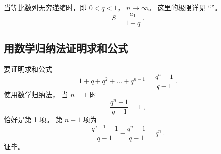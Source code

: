当等比数列无穷递缩时，即 $0<q<1$， $n\rightarrow \infty$。 这里的极限详见 “”。
\begin{equation}
S = \frac{a_1}{1 - q}~.
\end{equation}

\subsection{用数学归纳法证明求和公式}
要证明求和公式
\begin{equation}
1 + q + q^2 + \dots + q^{n-1} = \frac{q^n - 1}{q - 1}~.
\end{equation}
使用数学归纳法， 当 $n = 1$ 时
\begin{equation}
\frac{q^n - 1}{q - 1} = 1~,
\end{equation}
恰好是第 1 项。 第 $n + 1$ 项为
\begin{equation}
\frac{q^{n+1} - 1}{q - 1} - \frac{q^n - 1}{q - 1} = q^n~.
\end{equation}
证毕。
